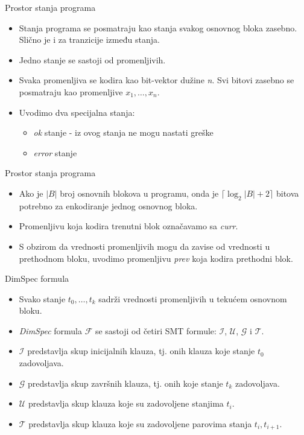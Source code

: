 \documentclass{beamer}
\begin{document}
\begin{frame}{Prostor stanja programa}
    \begin{itemize}
        \item Stanja programa se posmatraju kao stanja svakog osnovnog bloka zasebno. Slično je i za tranzicije između stanja.
        \item Jedno stanje se sastoji od promenljivih.
        \item Svaka promenljiva se kodira kao bit-vektor dužine \emph{n}. Svi bitovi zasebno se posmatraju kao promenljive $x_{1},  \dots , x_{n}$.
        \item Uvodimo dva specijalna stanja:
            \begin{itemize}
                \item \emph{ok} stanje - iz ovog stanja ne mogu nastati greške
                \item \emph{error} stanje
            \end{itemize}
    \end{itemize}
\end{frame}

\begin{frame}{Prostor stanja programa}
    \begin{itemize}
        \item Ako je $|B|$ broj osnovnih blokova u programu, onda je  $\lceil\log_{2}{|B| + 2}\rceil$ bitova potrebno za enkodiranje jednog osnovnog bloka.
        \item Promenljivu koja kodira trenutni blok označavamo sa \emph{curr}.
        \item S obzirom da vrednosti promenljivih mogu da zavise od vrednosti u prethodnom bloku, uvodimo promenljivu \emph{prev} koja kodira prethodni blok.
    \end{itemize}
\end{frame}

\begin{frame}{DimSpec formula}
    \begin{itemize}
        \item Svako stanje $t_{0}, \dots , t_{k}$ sadrži vrednosti promenljivih u tekućem osnovnom bloku.
        \item \emph{DimSpec} formula $\mathcal{F}$ se sastoji od četiri SMT formule: $\mathcal{I}$, $\mathcal{U}$, $\mathcal{G}$ i $\mathcal{T}$.
        \item $\mathcal{I}$ predstavlja skup inicijalnih klauza, tj. onih klauza koje stanje $t_{0}$ zadovoljava.
        \item $\mathcal{G}$ predstavlja skup završnih klauza, tj. onih koje stanje $t_{k}$ zadovoljava.
        \item $\mathcal{U}$ predstavlja skup klauza koje su zadovoljene stanjima $t_{i}$.
        \item $\mathcal{T}$ predstavlja skup klauza koje su zadovoljene parovima stanja $t_{i}, t_{i+1}$.
    \end{itemize}
\end{frame}
\end{document}
